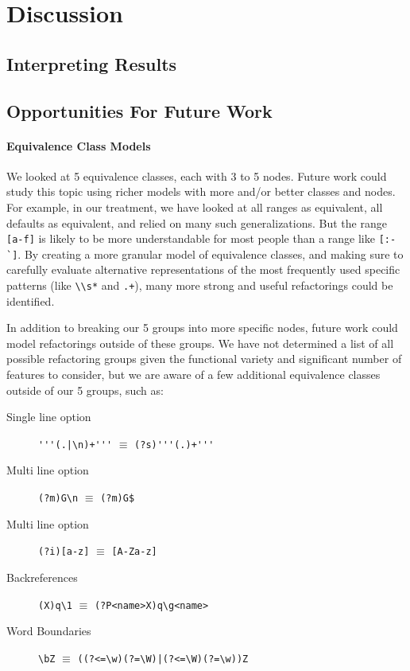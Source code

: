 \section{Discussion}
\label{sec:discussion}
\subsection{Interpreting Results}
\subsection{Opportunities For Future Work}
\paragraph{Equivalence Class Models}
We looked at 5 equivalence classes, each with 3 to 5 nodes.  Future work could study this topic using richer models with more and/or better classes and nodes.  For example, in our treatment, we have looked at all ranges as equivalent, all defaults as equivalent, and relied on many such generalizations.  But the range \verb![a-f]! is likely to be more understandable for most people than a range like \verb![:-`]!. By creating a more granular model of equivalence classes, and making sure to carefully evaluate alternative representations of the most frequently used specific patterns (like \verb!\\s*! and \verb!.+!), many more strong and useful refactorings could be identified.

In addition to breaking our 5 groups into more specific nodes, future work could model refactorings outside of these groups.  We have not determined a list of all possible refactoring groups given the functional variety and significant number of features to consider, but we are aware of a few additional equivalence classes outside of our 5 groups, such as:
\begin{description}
\item[Single line option]  \verb!'''(.|\n)+'''! $\equiv$ \verb!(?s)'''(.)+'''!
\item[Multi line option]  \verb!(?m)G\n! $\equiv$ \verb!(?m)G$!
\item[Multi line option]  \verb!(?i)[a-z]! $\equiv$ \verb![A-Za-z]!
\item[Backreferences]  \verb!(X)q\1! $\equiv$ \verb!(?P<name>X)q\g<name>!
\item[Word Boundaries]  \verb!\bZ! $\equiv$ \verb!((?<=\w)(?=\W)|(?<=\W)(?=\w))Z!
\end{description}

